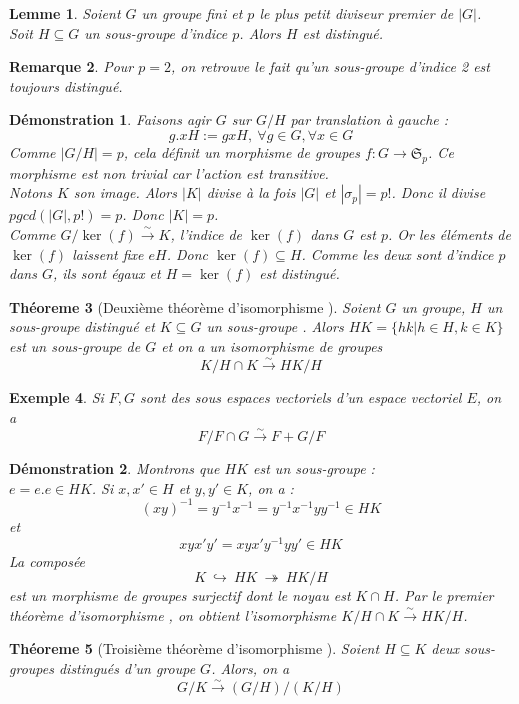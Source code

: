 \documentclass[a4paper, oneside]{report}
\theoremstyle{break}
\newtheorem{thm}{Théoreme}[section] %
\newtheorem{lemme}[thm]{Lemme}
\newtheorem{exem}[thm]{Exemple}
\newtheorem{remar}[thm]{Remarque}
\newtheorem*{demo}{Démonstration}
\newcommand{\sevs}{sous espaces vectoriels }
\newcommand{\ev}{espace vectoriel }
\newcommand{\mdg}{morphisme de groupes }
\newcommand{\isom}{isomorphisme }
\newcommand{\sg}{sous-groupe }
\newcommand{\sgs}{sous-groupes }
\newcommand{\fong}{\overset{\sim}{\rightarrow}}
\newcommand{\inj}{\hookrightarrow}
\newcommand{\surj}{\twoheadrightarrow}
\renewcommand{\S}{\mathfrak{S}}
\begin{document}
\begin{lemme}
Soient $G$ un groupe fini et $p$ le plus petit diviseur premier de $|G|$.\\
Soit $H\subseteq G$ un \sg d'indice $p$. Alors $H$ est distingué.
\end{lemme}

\begin{remar}
Pour $p=2$, on retrouve le fait qu'un \sg d'indice 2 est toujours distingué.
\end{remar}

\begin{demo}
Faisons agir $G$ sur $G/H$ par translation à gauche :
$$g.xH := gxH,~\forall g\in G,\forall x\in G$$
Comme $|G/H|=p$, cela définit un \mdg $f:G\rightarrow \S_p$. Ce morphisme est non trivial car l'action est transitive.\\
Notons $K$ son image. Alors $|K|$ divise à la fois $|G|$ et $|\sigma_p|=p!$. Donc il divise $pgcd(|G|,p!)=p$. Donc $|K|=p$.\\
Comme $G/\ker(f)\fong K$, l'indice de $\ker (f)$ dans $G$ est $p$. Or les éléments de $\ker(f)$ laissent fixe $eH$. Donc $\ker (f)\subseteq H$. Comme les deux sont d'indice $p$ dans $G$, ils sont égaux et $H=\ker (f)$ est distingué.
\end{demo}

\begin{thm}[Deuxième théorème d'\isom]
Soient $G$ un groupe, $H$ un \sg distingué et $K\subseteq G$ un \sg. Alors $HK=\{hk| h\in H, k\in K\}$ est un \sg de $G$ et on a un \isom de groupes 
$$K/H\cap K \fong HK/H$$
\end{thm}

\begin{exem}
Si $F,G$ sont des \sevs d'un \ev $E$, on a 
$$F/F\cap G \fong F+G/F$$
\end{exem}

\begin{demo}
Montrons que $HK$ est un \sg :\\
$e=e.e \in HK$. Si $x,x'\in H$ et $y,y' \in K$, on a :
$$(xy)^{-1}=y^{-1}x^{-1}=y^{-1}x^{-1}yy^{-1}\in HK$$
et 
$$xyx'y'=xyx'y^{-1}yy'\in HK$$
La composée 
$$K~\inj~HK~\surj~HK/H$$
est un \mdg surjectif dont le noyau est $K\cap H$. Par le premier théorème d'\isom, on obtient l'\isom $K/H\cap K \fong HK/H$.
\end{demo}

\begin{thm}[Troisième théorème d'\isom]
Soient $H\subseteq K$ deux \sgs distingués d'un groupe $G$. Alors, on a 
$$G/K \fong (G/H) \big/ (K/H)$$
\end{thm}
\end{document}
